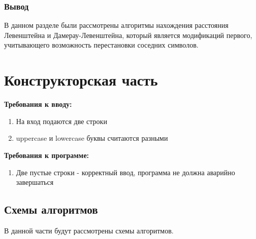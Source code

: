 \documentclass[12pt]{report}
\begin{document}
		\subsection{Вывод}
		В данном разделе были рассмотрены алгоритмы нахождения расстояния Левенштейна и Дамерау-Левенштейна, который является модификаций первого, учитывающего возможность перестановки соседних символов. 




\chapter{Конструкторская часть}
\textbf{Требования к вводу:}
\begin{enumerate}
  	\item На вход подаются две строки
	\item uppercase и lowercase буквы считаются разными
\end{enumerate}
\textbf{Требования к программе:}
\begin{enumerate}
  	\item Две пустые строки - корректный ввод, программа не должна аварийно завершаться
\end{enumerate}
\section{Схемы алгоритмов}
В данной части будут рассмотрены схемы алгоритмов.
\end{document}
